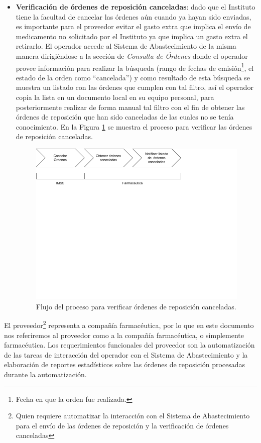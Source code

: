 \documentclass[letterpaper,11pt]{article}
\begin{document}
\begin{itemize}
\item \textbf{Verificación de órdenes de reposición canceladas}: dado que el Instituto tiene la facultad de cancelar las órdenes aún cuando ya hayan sido enviadas, es importante para el proveedor evitar el gasto extra que implica el envío de medicamento no solicitado por el Instituto ya que implica un gasto extra el retirarlo. El operador accede al Sistema de Abastecimiento de la misma manera dirigiéndose a la sección de \textit{Consulta de Órdenes} donde el operador provee información para realizar la búsqueda (rango de fechas de emisión\footnote{Fecha en que la orden fue realizada.}, el estado de la orden como ``cancelada'') y como resultado de esta búsqueda se muestra un listado con las órdenes que cumplen con tal filtro, así el operador copia la lista en un documento local en su equipo personal, para posteriormente realizar de forma manual tal filtro con el fin de obtener las órdenes de reposición que han sido canceladas de las cuales no se tenía conocimiento. En la Figura \ref{fig:flow-proc-verificar} se muestra el proceso para verificar las órdenes de reposición canceladas.
\begin{figure}[h]
\centering
\includegraphics[scale=0.3]{flujo-proceso-verificar} 
\caption{Flujo del proceso para verificar órdenes de reposición canceladas.}
\label{fig:flow-proc-verificar}
\end{figure}
\end{itemize}

El proveedor\footnote{Quien requiere automatizar la interacción con el Sistema de Abastecimiento para el envío de las órdenes de reposición y la verificación de órdenes canceladas} representa a compañía farmacéutica, por lo que en este documento nos referiremos al proveedor como a la compañía farmacéutica, o simplemente farmacéutica. Los requerimientos funcionales del proveedor son la automatización de las tareas de interacción del operador con el Sistema de Abastecimiento y la elaboración de reportes estadísticos sobre las órdenes de reposición procesadas durante la automatización.
\end{document}
